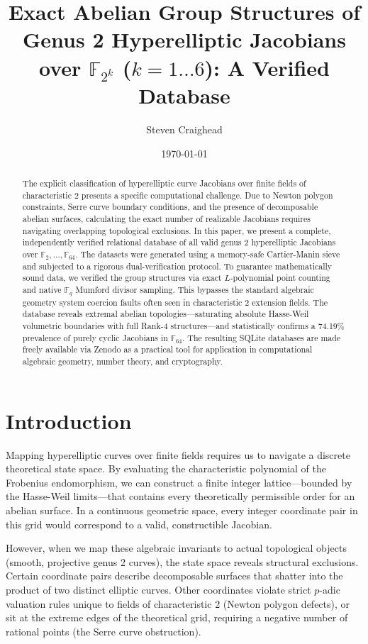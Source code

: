 \documentclass[letterpaper, 11pt]{article}
\title{Exact Abelian Group Structures of Genus 2 Hyperelliptic Jacobians over \texorpdfstring{$\mathbb{F}_{2^k}$}{F\_2\textasciicircum k} (\texorpdfstring{$k=1 \dots 6$}{k=1..6}): A Verified Database}
\author{Steven Craighead}
\date{\today}
\begin{document}
\maketitle

\begin{abstract}
The explicit classification of hyperelliptic curve Jacobians over finite fields of characteristic 2 presents a specific computational challenge. Due to Newton polygon constraints, Serre curve boundary conditions, and the presence of decomposable abelian surfaces, calculating the exact number of realizable Jacobians requires navigating overlapping topological exclusions. In this paper, we present a complete, independently verified relational database of all valid genus 2 hyperelliptic Jacobians over $\mathbb{F}_2, \dots, \mathbb{F}_{64}$. The datasets were generated using a memory-safe Cartier-Manin sieve and subjected to a rigorous dual-verification protocol. To guarantee mathematically sound data, we verified the group structures via exact $L$-polynomial point counting and native $\mathbb{F}_q$ Mumford divisor sampling. This bypasses the standard algebraic geometry system coercion faults often seen in characteristic 2 extension fields. The database reveals extremal abelian topologies—saturating absolute Hasse-Weil volumetric boundaries with full Rank-4 structures—and statistically confirms a 74.19\% prevalence of purely cyclic Jacobians in $\mathbb{F}_{64}$. The resulting SQLite databases are made freely available via Zenodo as a practical tool for application in computational algebraic geometry, number theory, and cryptography.
\end{abstract}

\section{Introduction}
Mapping hyperelliptic curves over finite fields requires us to navigate a discrete theoretical state space. By evaluating the characteristic polynomial of the Frobenius endomorphism, we can construct a finite integer lattice---bounded by the Hasse-Weil limits---that contains every theoretically permissible order for an abelian surface. In a continuous geometric space, every integer coordinate pair in this grid would correspond to a valid, constructible Jacobian.

However, when we map these algebraic invariants to actual topological objects (smooth, projective genus 2 curves), the state space reveals structural exclusions. Certain coordinate pairs describe decomposable surfaces that shatter into the product of two distinct elliptic curves. Other coordinates violate strict $p$-adic valuation rules unique to fields of characteristic 2 (Newton polygon defects), or sit at the extreme edges of the theoretical grid, requiring a negative number of rational points (the Serre curve obstruction).
\end{document}
